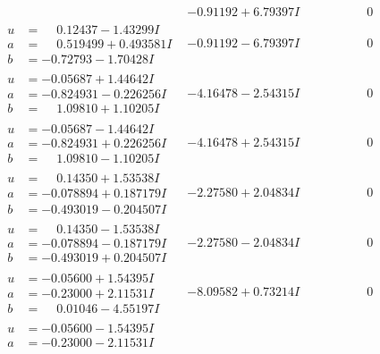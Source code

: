\documentclass[1p]{elsarticle_modified}
\theoremstyle{definition}
\begin{document}
$$\begin{array}{c|c|c}
 & -0.91192 + 6.79397 I & \phantom{-0.000000 } 0 \\ \hline\begin{aligned}
u &= \phantom{-}0.12437 - 1.43299 I \\
a &= \phantom{-}0.519499 + 0.493581 I \\
b &= -0.72793 - 1.70428 I\end{aligned}
 & -0.91192 - 6.79397 I & \phantom{-0.000000 } 0 \\ \hline\begin{aligned}
u &= -0.05687 + 1.44642 I \\
a &= -0.824931 - 0.226256 I \\
b &= \phantom{-}1.09810 + 1.10205 I\end{aligned}
 & -4.16478 - 2.54315 I & \phantom{-0.000000 } 0 \\ \hline\begin{aligned}
u &= -0.05687 - 1.44642 I \\
a &= -0.824931 + 0.226256 I \\
b &= \phantom{-}1.09810 - 1.10205 I\end{aligned}
 & -4.16478 + 2.54315 I & \phantom{-0.000000 } 0 \\ \hline\begin{aligned}
u &= \phantom{-}0.14350 + 1.53538 I \\
a &= -0.078894 + 0.187179 I \\
b &= -0.493019 - 0.204507 I\end{aligned}
 & -2.27580 + 2.04834 I & \phantom{-0.000000 } 0 \\ \hline\begin{aligned}
u &= \phantom{-}0.14350 - 1.53538 I \\
a &= -0.078894 - 0.187179 I \\
b &= -0.493019 + 0.204507 I\end{aligned}
 & -2.27580 - 2.04834 I & \phantom{-0.000000 } 0 \\ \hline\begin{aligned}
u &= -0.05600 + 1.54395 I \\
a &= -0.23000 + 2.11531 I \\
b &= \phantom{-}0.01046 - 4.55197 I\end{aligned}
 & -8.09582 + 0.73214 I & \phantom{-0.000000 } 0 \\ \hline\begin{aligned}
u &= -0.05600 - 1.54395 I \\
a &= -0.23000 - 2.11531 I \\

\end{aligned}
\end{array}$$
\end{document}
